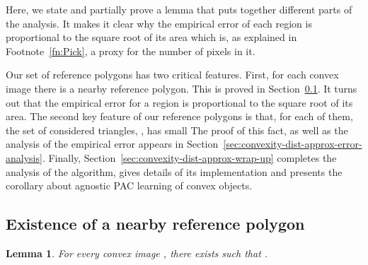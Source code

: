 \documentclass[11pt,english]{article}
\newtheorem{lemma}[theorem]{Lemma}
\numberwithin{figure}{section}
\begin{document}
Here, we state and partially prove a lemma that puts together different parts of the analysis. It makes it clear why the empirical error of each region is proportional to the square root of its area which is, as explained in Footnote~\ref{fn:Pick}, a proxy for the number of pixels in it.


\else
Our set of reference polygons has two critical features. First, for each convex image there is a nearby reference polygon. This is proved in Section~\ref{sec:existence-of-nearby-ref-poly}. It turns out that the empirical error for a region is proportional to the square root of its area. The second key feature of our reference polygons is that, for each of them, the set of considered triangles, , has small  The proof of this fact, as well as the analysis of the empirical error appears in Section~\ref{sec:convexity-dist-approx-error-analysis}. Finally, Section~\ref{sec:convexity-dist-approx-wrap-up} completes the analysis of the algorithm, gives details of its implementation and presents the corollary about agnostic PAC learning of convex objects.

\subsection{Existence of a nearby reference polygon}\label{sec:existence-of-nearby-ref-poly}
\begin{lemma}\label{lem:nearby-reference-polygon}
 For every convex image , there exists  such that .
\end{lemma}
\end{document}
